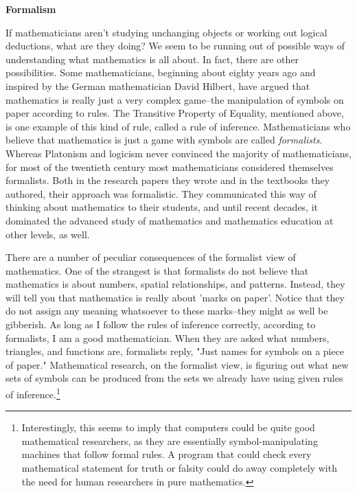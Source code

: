 \noindent
\textbf{Formalism}

    If mathematicians aren't studying unchanging objects or working out logical deductions, what are they doing?  We seem to be running out of possible ways of understanding what mathematics is all about.  In fact, there are other possibilities.  Some mathematicians, beginning about eighty years ago and inspired by the German mathematician David Hilbert, have argued that mathematics is really just a very complex game--the manipulation of symbols on paper according to rules.  The Transitive Property of Equality, mentioned above, is one example of this kind of rule, called a rule of inference.  Mathematicians who believe that mathematics is just a game with symbols are called \emph{formalists}.  Whereas Platonism and logicism never convinced the majority of mathematicians, for most of the twentieth century most mathematicians considered themselves formalists.  Both in the research papers they wrote and in the textbooks they authored, their approach was formalistic.  They communicated this way of thinking about mathematics to their students, and until recent decades, it dominated the advanced study of mathematics and mathematics education at other levels, as well.
     
     There are a number of peculiar consequences of the formalist view of mathematics.  One of the strangest is that formalists do not believe that mathematics is about numbers, spatial relationships, and patterns.  Instead, they will tell you that mathematics is really about 'marks on paper'.  Notice that they do not assign any meaning whatsoever to these marks--they might as well be gibberish.  As long as I follow the rules of inference correctly, according to formalists, I am a good mathematician.  When they are asked what numbers, triangles, and functions are, formalists reply, "Just names for symbols on a piece of paper."   Mathematical research, on the formalist view, is figuring out what new sets of symbols can be produced from the sets we already have using given rules of inference.\footnote{Interestingly, this seems to imply that computers could be quite good mathematical researchers, as they are essentially symbol-manipulating machines that follow formal rules.  A program that could check every mathematical statement for truth or falsity could do away completely with the need for human researchers in pure mathematics.}
     
